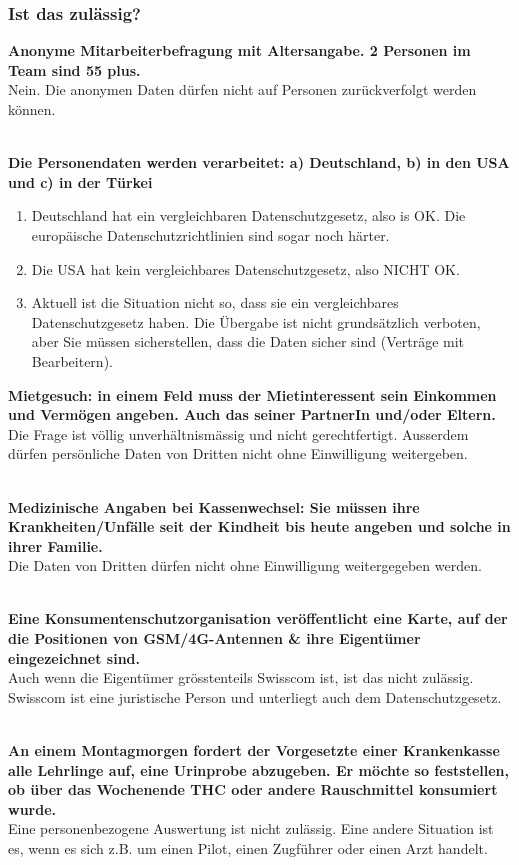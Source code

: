 \subsubsection{Ist das zulässig?}

\textbf{Anonyme Mitarbeiterbefragung mit Altersangabe. 2 Personen im
Team sind 55 plus.}\\
Nein. Die anonymen Daten dürfen nicht auf Personen zurückverfolgt werden
können.

\mbox{}\\
\textbf{Die Personendaten werden verarbeitet: a) Deutschland, b) in den
USA und c) in der Türkei}

\begin{enumerate}
	\tightlist
	\item Deutschland hat ein vergleichbaren Datenschutzgesetz, also is OK. Die
	europäische Datenschutzrichtlinien sind sogar noch härter.
	\item Die USA hat kein vergleichbares Datenschutzgesetz, also NICHT OK.
	\item Aktuell ist die Situation nicht so, dass sie ein vergleichbares
	Datenschutzgesetz haben. Die Übergabe ist nicht grundsätzlich
	verboten, aber Sie müssen sicherstellen, dass die Daten sicher sind
	(Verträge mit Bearbeitern).
\end{enumerate}

\textbf{Mietgesuch: in einem Feld muss der Mietinteressent sein
Einkommen und Vermögen angeben. Auch das seiner PartnerIn und/oder
Eltern.}\\
Die Frage ist völlig unverhältnismässig und nicht gerechtfertigt.
Ausserdem dürfen persönliche Daten von Dritten nicht ohne Einwilligung
weitergeben.

\mbox{}\\
\textbf{Medizinische Angaben bei Kassenwechsel: Sie müssen ihre
Krankheiten/Unfälle seit der Kindheit bis heute angeben und solche in
ihrer Familie.}\\
Die Daten von Dritten dürfen nicht ohne Einwilligung weitergegeben
werden.

\mbox{}\\
\textbf{Eine Konsumentenschutzorganisation veröffentlicht eine Karte,
auf der die Positionen von GSM/4G-Antennen \& ihre Eigentümer
eingezeichnet sind.}\\
Auch wenn die Eigentümer grösstenteils Swisscom ist, ist das nicht
zulässig. Swisscom ist eine juristische Person und unterliegt auch dem
Datenschutzgesetz.

\mbox{}\\
\textbf{An einem Montagmorgen fordert der Vorgesetzte einer Krankenkasse
alle Lehrlinge auf, eine Urinprobe abzugeben. Er möchte so feststellen,
ob über das Wochenende THC oder andere Rauschmittel konsumiert wurde.}\\
Eine personenbezogene Auswertung ist nicht zulässig. Eine andere
Situation ist es, wenn es sich z.B. um einen Pilot, einen Zugführer oder
einen Arzt handelt.

